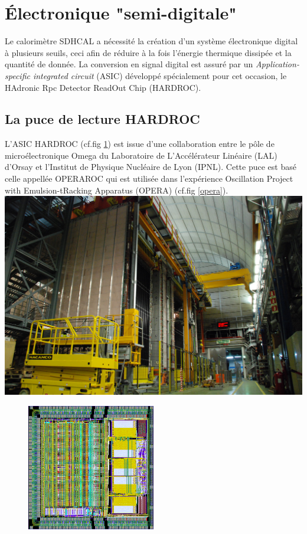 \section{Électronique "semi-digitale"}
Le calorimètre SDHCAL a nécessité la création d'un système électronique digital à plusieurs seuils, ceci afin de réduire à la fois l'énergie thermique dissipée et la quantité de donnée. La conversion en signal digital est assuré par un \textit{Application-specific integrated circuit} (ASIC) développé spécialement pour cet occasion, le HAdronic Rpc Detector ReadOut Chip (HARDROC)\cite{Dulucq:2010ssa}.

\subsection{La puce de lecture HARDROC}
L'ASIC HARDROC (cf.fig \ref{hardroc}) est issue d'une collaboration entre le pôle de microélectronique Omega du Laboratoire de L'Accélérateur Linéaire (LAL) d'Orsay et l'Institut de Physique Nucléaire de Lyon (IPNL). Cette puce est basé celle appellée OPERAROC qui est utilisée dans l'expérience Oscillation Project with Emulsion-tRacking Apparatus (OPERA) (cf.fig \ref{opera}).
\marginpar
{
	\centering
	\includegraphics[width=\marginparwidth]{GLA/OPERA.jpg}
	\label{opera}
}
\begin{figure}[ht!]
	\centering
	\includegraphics[width=0.5\textwidth]{GLA/HARDROC.png}
	\label{hardroc}
\end{figure}
